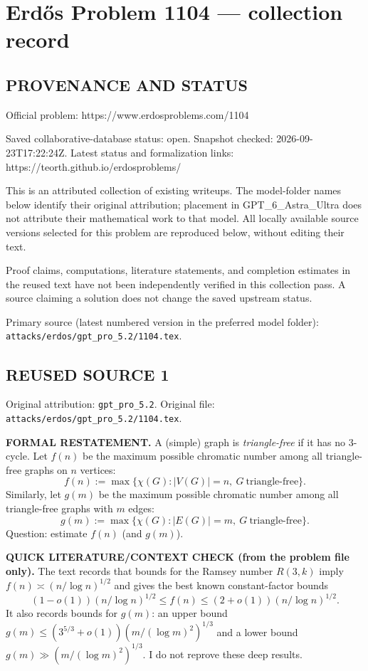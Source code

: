 \section*{Erd\H{o}s Problem 1104 --- collection record}

\subsection*{PROVENANCE AND STATUS}
Official problem: https://www.erdosproblems.com/1104

Saved collaborative-database status: open.
Snapshot checked: 2026-09-23T17:22:24Z.
Latest status and formalization links: https://teorth.github.io/erdosproblems/

This is an attributed collection of existing writeups. The model-folder names below identify their original attribution; placement in GPT\_6\_Astra\_Ultra does not attribute their mathematical work to that model. All locally available source versions selected for this problem are reproduced below, without editing their text.

Proof claims, computations, literature statements, and completion estimates in the reused text have not been independently verified in this collection pass. A source claiming a solution does not change the saved upstream status.

Primary source (latest numbered version in the preferred model folder): \texttt{attacks/erdos/gpt\_pro\_5.2/1104.tex}.

\subsection*{REUSED SOURCE 1}
Original attribution: \texttt{gpt\_pro\_5.2}.
Original file: \texttt{attacks/erdos/gpt\_pro\_5.2/1104.tex}.


\noindent\textbf{FORMAL RESTATEMENT.}
A (simple) graph is \emph{triangle-free} if it has no $3$-cycle.
Let $f(n)$ be the maximum possible chromatic number among all triangle-free graphs on $n$ vertices:
\[f(n):=\max\{\chi(G): |V(G)|=n,\ G\ \text{triangle-free}\}.
\]
Similarly, let $g(m)$ be the maximum possible chromatic number among all triangle-free graphs with $m$ edges:
\[g(m):=\max\{\chi(G): |E(G)|=m,\ G\ \text{triangle-free}\}.
\]
Question: estimate $f(n)$ (and $g(m)$).

\medskip
\noindent\textbf{QUICK LITERATURE/CONTEXT CHECK (from the problem file only).}
The text records that bounds for the Ramsey number $R(3,k)$ imply $f(n)\asymp (n/\log n)^{1/2}$ and gives the best known constant-factor bounds
\[(1-o(1))(n/\log n)^{1/2}\le f(n)\le (2+o(1))(n/\log n)^{1/2}.
\]
It also records bounds for $g(m)$: an upper bound $g(m)\le (3^{5/3}+o(1))(m/(\log m)^2)^{1/3}$ and a lower bound $g(m)\gg (m/(\log m)^2)^{1/3}$.
I do not reprove these deep results.

